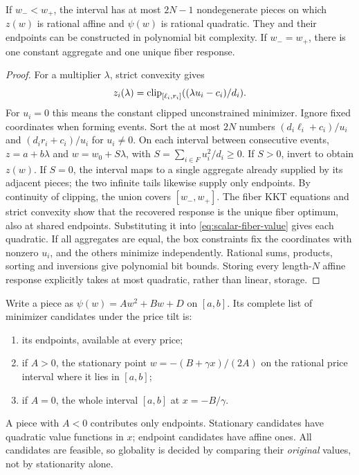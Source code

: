 \begin{lemma}\label{lem:scalar-fiber-pieces}
If $w_-<w_+$, the interval has at most $2N-1$ nondegenerate pieces on which
$z(w)$ is rational affine and $\psi(w)$ is rational quadratic. They and their
endpoints can be constructed in polynomial bit complexity. If $w_-=w_+$,
there is one constant aggregate and one unique fiber response.
\end{lemma}
\begin{proof}
For a multiplier $\lambda$, strict convexity gives
\[
 z_i(\lambda)=\operatorname{clip}_{[\ell_i,r_i]}((\lambda u_i-c_i)/d_i).
\]
For $u_i=0$ this means the constant clipped unconstrained minimizer. Ignore
fixed coordinates when forming events. Sort the at most $2N$ numbers
$(d_i\ell_i+c_i)/u_i$ and $(d_ir_i+c_i)/u_i$ for $u_i\ne0$.
On each interval between consecutive events, $z=a+b\lambda$ and
$w=w_0+S\lambda$, with $S=\sum_{i\in F}u_i^2/d_i\ge0$.
If $S>0$, invert to obtain $z(w)$. If $S=0$, the interval maps to a single
aggregate already supplied by its adjacent pieces; the two infinite tails
likewise supply only endpoints. By continuity of clipping, the union
covers $[w_-,w_+]$. The fiber KKT equations and strict convexity show that the
recovered response is the unique fiber optimum, also at shared endpoints.
Substituting it into \eqref{eq:scalar-fiber-value} gives each quadratic.
If all aggregates are equal, the box constraints fix the coordinates with
nonzero $u_i$, and the others minimize independently. Rational sums, products,
sorting and inversions give polynomial bit bounds. Storing every length-$N$
affine response explicitly takes at most quadratic, rather than linear, storage.
\end{proof}

Write a piece as $\psi(w)=Aw^2+Bw+D$ on $[a,b]$. Its complete list of minimizer
candidates under the price tilt is:
\begin{enumerate}
\item its endpoints, available at every price;
\item if $A>0$, the stationary point $w=-(B+\gamma x)/(2A)$ on the rational
price interval where it lies in $[a,b]$;
\item if $A=0$, the whole interval $[a,b]$ at $x=-B/\gamma$.
\end{enumerate}
A piece with $A<0$ contributes only endpoints. Stationary candidates have
quadratic value functions in $x$; endpoint candidates have affine ones.
All candidates are feasible, so globality is decided by comparing their
\emph{original} values, not by stationarity alone.

